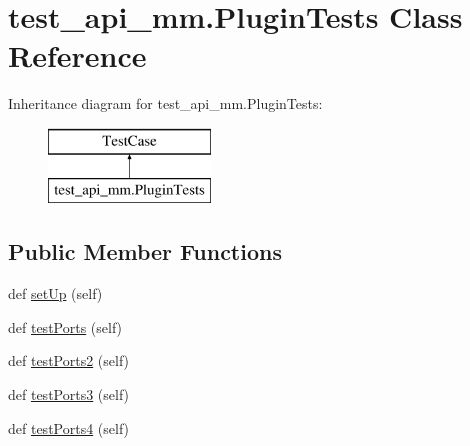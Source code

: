 \hypertarget{classtest__api__mm_1_1_plugin_tests}{}\section{test\+\_\+api\+\_\+mm.\+Plugin\+Tests Class Reference}
\label{classtest__api__mm_1_1_plugin_tests}
Inheritance diagram for test\+\_\+api\+\_\+mm.\+Plugin\+Tests\+:\begin{figure}[H]
\begin{center}
\leavevmode
\includegraphics[height=2.000000cm]{classtest__api__mm_1_1_plugin_tests}
\end{center}
\end{figure}
\subsection*{Public Member Functions}
\begin{DoxyCompactItemize}
\item 
def \hyperlink{classtest__api__mm_1_1_plugin_tests_a55749bc22b5645b508710fea87b779fc}{set\+Up} (self)
\item 
def \hyperlink{classtest__api__mm_1_1_plugin_tests_a8b950d8e3543c617a6bb133198b6b0d2}{test\+Ports} (self)
\item 
def \hyperlink{classtest__api__mm_1_1_plugin_tests_a81cfe3cab893742609fa60677bf2a7fd}{test\+Ports2} (self)
\item 
def \hyperlink{classtest__api__mm_1_1_plugin_tests_af7516d051b175b233d504df37914dff2}{test\+Ports3} (self)
\item 
def \hyperlink{classtest__api__mm_1_1_plugin_tests_a3edbde2c4333d9aef6589c75223e2f6f}{test\+Ports4} (self)
\end{DoxyCompactItemize}
